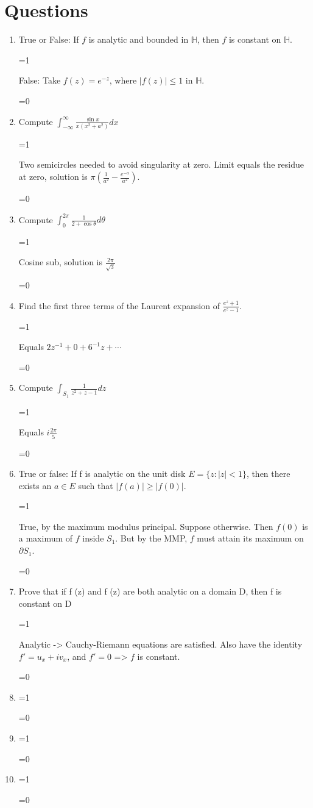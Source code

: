 \documentclass{article}
\def\showanswers{1}
\newcommand{\hide}[1]{
   \ifnum\showanswers=1
 
   #1 \vspace{\baselineskip}
   \fi
 
   \ifnum\showanswers=0
   \vspace{2\baselineskip} \hspace{2cm}
   \fi
}
\begin{document}
\section{Questions}
\begin{enumerate}
   \item True or False: If $f$ is analytic and bounded in $\mathbb{H}$, then $f$ is constant on $\mathbb{H}$.
   \hide{
   False: Take $f(z) = e^{-z}$, where $|f(z)| \leq 1$ in $\mathbb{H}$.
   }
 
   \item Compute $\int_{-\infty}^{\infty} \frac{\sin x}{x(x^2+a^2)}dx$
   \hide{
   Two semicircles needed to avoid singularity at zero. Limit equals the residue at zero, solution is $\pi (\frac{1}{a^2} - \frac{e^{-a}}{a^2})$.
   }
   
   \item Compute $\int_0^{2\pi} \frac{1}{2+\cos\theta}d\theta$
   \hide{
   Cosine sub, solution is $\frac{2\pi}{\sqrt{3}}$
   }
   
   \item Find the first three terms of the Laurent expansion of $\frac{e^z+1}{e^z-1}$.
   \hide{
   Equals $2z^{-1} + 0 + 6^{-1}z + \cdots$
   }
   
  \item Compute $\int_{S_1} \frac{1}{z^2+z-1}dz$
   \hide{
    Equals $i\frac{2\pi}{5}$
   }
   
  \item True or false: If f is analytic on the unit disk $E = \{z : |z| < 1\}$, then there exists an $a \in E$ such
  that $|f (a)| \geq |f (0)|$.
   \hide{
   True, by the maximum modulus principal. Suppose otherwise. Then $f(0)$ is a maximum of $f$ inside $S_1$. But by the MMP, $f$ must attain its maximum on $\partial S_1$.
   }
   
   \item Prove that if f (z) and f (z) are both analytic on a domain D, then f is constant on D
   \hide{
   Analytic -> Cauchy-Riemann equations are satisfied. Also have the identity $f' = u_x + iv_x$, and $f' = 0$ => $f$ is constant.
   }
   
   \item
   \hide{
   
   }
   
   \item
   \hide{
   
   }
   
   \item
   \hide{
   
   }
\end{enumerate}
\end{document}
